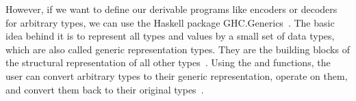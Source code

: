 \begin{frame}
    
    However, if we want to define our derivable programs like encoders or decoders for arbitrary types, we can use the Haskell package GHC.Generics~\cite{ghc-generics}. The basic idea behind it is to represent all types and values by a small set of data types, which are also called generic representation types. They are the building blocks of the structural representation of all other types~\cite{optimizing-generics}.
    Using the  and  functions, the user can convert arbitrary types to their generic representation, operate on them, and convert them back to their original types~\cite{optimizing-generics,history-of-haskell, ghc-generics}.

\end{frame}


